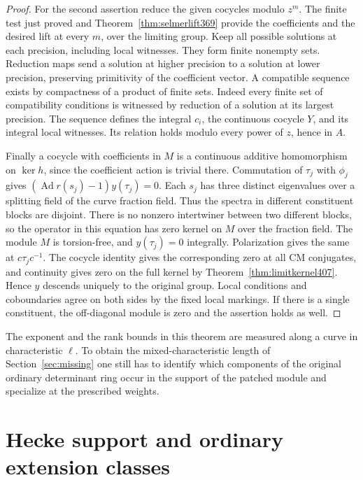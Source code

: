 \documentclass[a4paper,11pt]{article}
\theoremstyle{definition}
\theoremstyle{remark}
\numberwithin{equation}{section}
\begin{document}
\begin{proof}
For the second assertion reduce the given cocycles modulo
\(z^m\). The finite test just proved and
Theorem~\ref{thm:selmerlift369} provide the coefficients
and the desired lift at every \(m\), over the limiting
group. Keep all possible solutions at each precision,
including local witnesses. They form finite nonempty sets.
Reduction maps send a solution at higher precision to a
solution at lower precision, preserving primitivity of the
coefficient vector. A compatible sequence exists by compactness
of a product of finite sets. Indeed every finite set of
compatibility conditions is witnessed by reduction of a
solution at its largest precision. The sequence defines
the integral \(c_i\), the continuous cocycle \(Y\), and
its integral local witnesses. Its relation holds modulo
every power of \(z\), hence in \(A\).

Finally a cocycle with coefficients in \(M\) is a continuous
additive homomorphism on \(\ker h\), since the coefficient
action is trivial there. Commutation of \(\tau_j\) with
\(\phi_j\) gives
\((\operatorname{Ad}r(s_j)-1)y(\tau_j)=0\).
Each \(s_j\) has three distinct eigenvalues over a splitting
field of the curve fraction field. Thus the spectra in
different constituent blocks are disjoint. There is no
nonzero intertwiner between two different blocks, so the
operator in this equation has zero kernel on \(M\) over the
fraction field. The module \(M\) is torsion-free, and
\(y(\tau_j)=0\) integrally. Polarization gives the same at
\(c\tau_jc^{-1}\). The cocycle identity gives the corresponding
zero at all CM conjugates, and continuity gives zero on
the full kernel by Theorem~\ref{thm:limitkernel407}. Hence
\(y\) descends uniquely to the original group. Local
conditions and coboundaries agree on both sides by the
fixed local markings. If there is a single constituent,
the off-diagonal module is zero and the assertion holds
as well.
\end{proof}

The exponent and the rank bounds in this theorem are measured
along a curve in characteristic \(\ell\). To obtain the
mixed-characteristic length of Section~\ref{sec:missing}
one still has to identify which components of the original
ordinary determinant ring occur in the support of the
patched module and specialize at the prescribed weights.

\section{Hecke support and ordinary extension classes}\label{nav:chapter-ordinary-hecke}
\end{document}

